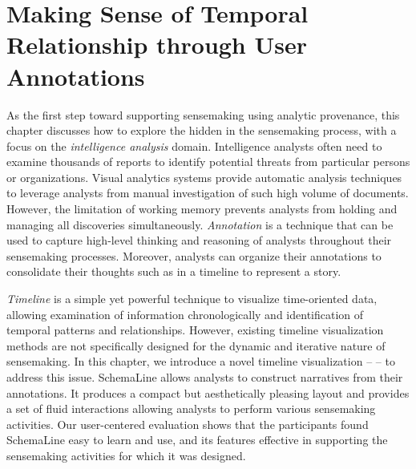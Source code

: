 \chapter{Making Sense of Temporal Relationship through User Annotations}
\label{chap:schemaline}

\graphicspath{{Chapter3/figures/}}


As the first step toward supporting sensemaking using analytic provenance, this chapter discusses how to explore the  hidden in the sensemaking process, with a focus on the \emph{intelligence analysis} domain. Intelligence analysts often need to examine thousands of reports to identify potential threats from particular persons or organizations. Visual analytics systems provide automatic analysis techniques to leverage analysts from manual investigation of such high volume of documents. However, the limitation of working memory prevents analysts from holding and managing all discoveries simultaneously. \emph{Annotation} is a technique that can be used to capture high-level thinking and reasoning of analysts throughout their sensemaking processes. Moreover, analysts can organize their annotations to consolidate their thoughts such as in a timeline to represent a story.

\emph{Timeline} is a simple yet powerful technique to visualize time-oriented data, allowing examination of information chronologically and identification of temporal patterns and relationships. However, existing timeline visualization methods are not specifically designed for the dynamic and iterative nature of sensemaking. In this chapter, we introduce a novel timeline visualization -- \emph{} -- to address this issue. SchemaLine allows analysts to construct narratives from their annotations. It produces a compact but aesthetically pleasing layout and provides a set of fluid interactions allowing analysts to perform various sensemaking activities. Our user-centered evaluation shows that the participants found SchemaLine easy to learn and use, and its features effective in supporting the sensemaking activities for which it was designed.






